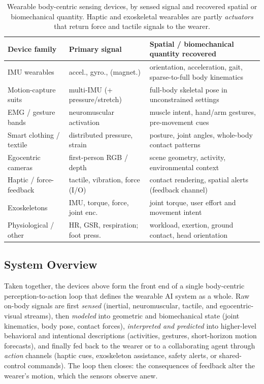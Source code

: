 \begin{table}[!th]
\centering
\caption{Wearable body-centric sensing devices, by sensed signal and recovered spatial or biomechanical quantity. Haptic and exoskeletal wearables are partly \emph{actuators} that return force and tactile signals to the wearer.}
\label{tab:p4_s9_3_devices}
\fontsize{8}{10}\selectfont
\setlength{\tabcolsep}{1.0mm}
\begin{tabular}{L{0.22\textwidth} L{0.28\textwidth} L{0.42\textwidth}}
\toprule
\textbf{Device family} & \textbf{Primary signal} & \textbf{Spatial / biomechanical quantity recovered} \\
\midrule
IMU wearables            & accel., gyro., (magnet.)          & orientation, acceleration, gait, sparse-to-full body kinematics \\
Motion-capture suits     & multi-IMU (+ pressure/stretch)    & full-body skeletal pose in unconstrained settings \\
EMG / gesture bands      & neuromuscular activation          & muscle intent, hand/arm gestures, pre-movement cues \\
Smart clothing / textile & distributed pressure, strain      & posture, joint angles, whole-body contact patterns \\
Egocentric cameras       & first-person RGB / depth          & scene geometry, activity, environmental context \\
Haptic / force-feedback  & tactile, vibration, force (I/O)   & contact rendering, spatial alerts (feedback channel) \\
Exoskeletons             & IMU, torque, force, joint enc.\   & joint torque, user effort and movement intent \\
Physiological / other    & HR, GSR, respiration; foot press. & workload, exertion, ground contact, head orientation \\
\bottomrule
\end{tabular}
\end{table}


\subsection{System Overview}
\label{subsec:p4-sec9-3-system-overview}

Taken together, the devices above form the front end of a single body-centric perception-to-action loop that defines the wearable AI system as a whole. 
Raw on-body signals are first \emph{sensed} (inertial, neuromuscular, tactile, and egocentric-visual streams), then \emph{modeled} into geometric and biomechanical state (joint kinematics, body pose, contact forces), \emph{interpreted and predicted} into higher-level behavioral and intentional descriptions (activities, gestures, short-horizon motion forecasts), and finally fed back to the wearer or to a collaborating agent through \emph{action} channels (haptic cues, exoskeleton assistance, safety alerts, or shared-control commands). 
The loop then closes: the consequences of feedback alter the wearer's motion, which the sensors observe anew.

